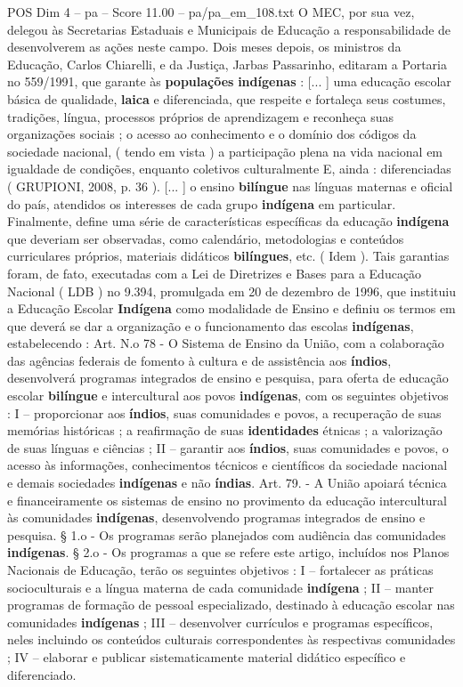 \begin{textsample}{POS Dim 4 – pa – Score 11.00 – pa/pa\_em\_108.txt}
O MEC, por sua vez, delegou às Secretarias Estaduais e Municipais de Educação a responsabilidade de desenvolverem as ações neste campo.
Dois meses depois, os ministros da Educação, Carlos Chiarelli, e da Justiça, Jarbas Passarinho, editaram a Portaria no 559/1991, que garante às \textbf{populações} \textbf{indígenas} : [... ] uma educação escolar básica de qualidade, \textbf{laica} e diferenciada, que respeite e fortaleça seus costumes, tradições, língua, processos próprios de aprendizagem e reconheça suas organizações sociais ; o acesso ao conhecimento e o domínio dos códigos da sociedade nacional, ( tendo em vista ) a participação plena na vida nacional em igualdade de condições, enquanto coletivos culturalmente E, ainda : diferenciadas ( GRUPIONI, 2008, p. 36 ). [... ] o ensino \textbf{bilíngue} nas línguas maternas e oficial do país, atendidos os interesses de cada grupo \textbf{indígena} em particular.
Finalmente, define uma série de características específicas da educação \textbf{indígena} que deveriam ser observadas, como calendário, metodologias e conteúdos curriculares próprios, materiais didáticos \textbf{bilíngues}, etc. ( Idem ).
Tais garantias foram, de fato, executadas com a Lei de Diretrizes e Bases para a Educação Nacional ( LDB ) no 9.394, promulgada em 20 de dezembro de 1996, que instituiu a Educação Escolar \textbf{Indígena} como modalidade de Ensino e definiu os termos em que deverá se dar a organização e o funcionamento das escolas \textbf{indígenas}, estabelecendo : Art.
N.o 78 - O Sistema de Ensino da União, com a colaboração das agências federais de fomento à cultura e de assistência aos \textbf{índios}, desenvolverá programas integrados de ensino e pesquisa, para oferta de educação escolar \textbf{bilíngue} e intercultural aos povos \textbf{indígenas}, com os seguintes objetivos : I – proporcionar aos \textbf{índios}, suas comunidades e povos, a recuperação de suas memórias históricas ; a reafirmação de suas \textbf{identidades} étnicas ; a valorização de suas línguas e ciências ; II – garantir aos \textbf{índios}, suas comunidades e povos, o acesso às informações, conhecimentos técnicos e científicos da sociedade nacional e demais sociedades \textbf{indígenas} e não \textbf{índias}.
Art. 79. - A União apoiará técnica e financeiramente os sistemas de ensino no provimento da educação intercultural às comunidades \textbf{indígenas}, desenvolvendo programas integrados de ensino e pesquisa. § 1.o - Os programas serão planejados com audiência das comunidades \textbf{indígenas}. § 2.o - Os programas a que se refere este artigo, incluídos nos Planos Nacionais de Educação, terão os seguintes objetivos : I – fortalecer as práticas socioculturais e a língua materna de cada comunidade \textbf{indígena} ; II – manter programas de formação de pessoal especializado, destinado à educação escolar nas comunidades \textbf{indígenas} ; III – desenvolver currículos e programas específicos, neles incluindo os conteúdos culturais correspondentes às respectivas comunidades ; IV – elaborar e publicar sistematicamente material didático específico e diferenciado.

\end{textsample}
